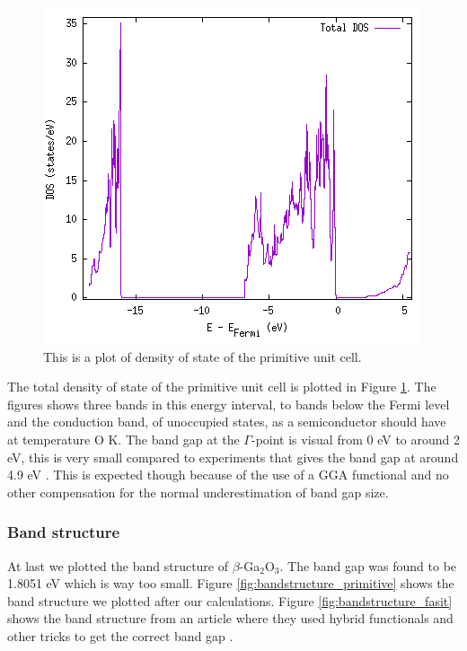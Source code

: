 \begin{figure}[H]
\includegraphics[width=\linewidth]{../fig/dosplot/total_DOS_primitive}\caption{This is a plot of density of state of the primitive unit cell.}\label{fig:total_dos_primitive}
\end{figure}

The total density of state of the primitive unit cell is plotted in Figure \ref{fig:total_dos_primitive}. The figures shows three bands in this energy interval, to bands below the Fermi level and the conduction band, of unoccupied states, as a semiconductor should have at temperature O K. The band gap at the $\Gamma$-point is visual from 0 eV to around 2 eV, this is very small compared to experiments that gives the band gap at around 4.9 eV \cite{dft_ga2o3}. This is expected though because of the use of a GGA functional and no other compensation for the normal underestimation of band gap size.


\subsubsection{Band structure}

At last we plotted the band structure of $\beta$-Ga$_2$O$_3$. The band gap was found to be 1.8051 eV which is way too small. Figure \ref{fig:bandstructure_primitive} shows the band structure we plotted after our calculations. Figure \ref{fig:bandstructure_fasit} shows the band structure from an article where they used hybrid functionals and other tricks to get the correct band gap \cite{dft_ga2o3}. 

